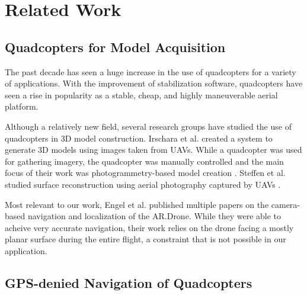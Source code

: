 
\chapter{Related Work\label{ch:pastwork}}

\section{Quadcopters for Model Acquisition}

The past decade has seen a huge increase in the use of quadcopters for a variety of applications. With the improvement of stabilization software, quadcopters have seen a rise in popularity as a stable, cheap, and highly maneuverable aerial platform. 

Although a relatively new field, several research groups have studied the use of quadcopters in 3D model construction. Irschara et al. created a system to generate 3D models using images taken from UAVs. While a quadcopter was used for gathering imagery, the quadcopter was manually controlled and the main focus of their work was photogrammetry-based model creation \cite{Irschara}. Steffen et al. studied surface reconstruction using aerial photography captured by UAVs \cite{Steffen}.

Most relevant to our work, Engel et al. published multiple papers on the camera-based navigation and localization of the AR.Drone. While they were able to acheive very accurate navigation, their work relies on the drone facing a mostly planar surface during the entire flight, a constraint that is not possible in our application.

\section{GPS-denied Navigation of Quadcopters}

